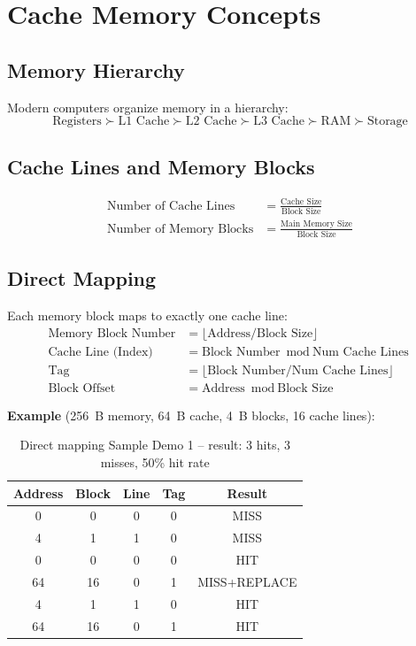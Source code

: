 \documentclass[12pt,a4paper]{report}
\begin{document}
\chapter{Cache Memory Concepts}

\section{Memory Hierarchy}
Modern computers organize memory in a hierarchy:
$$\text{Registers} \succ \text{L1 Cache} \succ \text{L2 Cache} \succ \text{L3 Cache} \succ \text{RAM} \succ \text{Storage}$$

\section{Cache Lines and Memory Blocks}
\begin{align}
\text{Number of Cache Lines} &= \frac{\text{Cache Size}}{\text{Block Size}} \\
\text{Number of Memory Blocks} &= \frac{\text{Main Memory Size}}{\text{Block Size}}
\end{align}

\section{Direct Mapping}
Each memory block maps to exactly one cache line:
\begin{align}
\text{Memory Block Number} &= \lfloor\text{Address} / \text{Block Size}\rfloor \\
\text{Cache Line (Index)}  &= \text{Block Number} \bmod \text{Num Cache Lines} \\
\text{Tag}                 &= \lfloor\text{Block Number} / \text{Num Cache Lines}\rfloor \\
\text{Block Offset}        &= \text{Address} \bmod \text{Block Size}
\end{align}

\textbf{Example} (256~B memory, 64~B cache, 4~B blocks, 16 cache lines):
\begin{table}[H]
\centering
\begin{tabular}{ccccc}
\toprule
\textbf{Address} & \textbf{Block} & \textbf{Line} & \textbf{Tag} & \textbf{Result} \\
\midrule
0  & 0  & 0  & 0 & \textcolor{missred}{MISS} \\
4  & 1  & 1  & 0 & \textcolor{missred}{MISS} \\
0  & 0  & 0  & 0 & \textcolor{hitgreen}{HIT} \\
64 & 16 & 0  & 1 & \textcolor{warnorg}{MISS+REPLACE} \\
4  & 1  & 1  & 0 & \textcolor{hitgreen}{HIT} \\
64 & 16 & 0  & 1 & \textcolor{hitgreen}{HIT} \\
\bottomrule
\end{tabular}
\caption{Direct mapping Sample Demo 1 -- result: 3 hits, 3 misses, 50\% hit rate}
\end{table}
\end{document}

